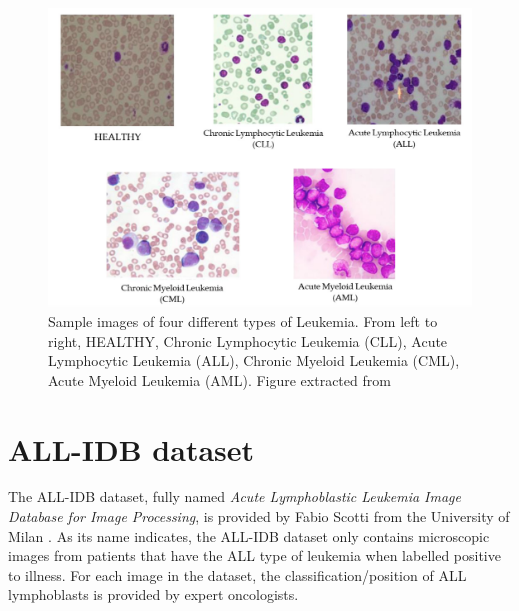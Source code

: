 \documentclass[11pt, openany]{report}
\theoremstyle{plain}
\theoremstyle{definition}
\theoremstyle{remark}
\begin{document}
\begin{figure}[H]
  \centering
  \includegraphics[scale=0.6]{figures/leukemia-subtypes.png}
  \caption{Sample images of four different types of Leukemia. From left to right, HEALTHY, Chronic Lymphocytic Leukemia (CLL), Acute Lymphocytic Leukemia (ALL), Chronic Myeloid Leukemia (CML), Acute Myeloid Leukemia (AML). Figure extracted from \cite{leukemia}}
  \label{fig:leukemia-subtypes}
\end{figure}

\newpage
\section{ALL-IDB dataset} \label{sec:all-idb}
The ALL-IDB dataset, fully named \textit{Acute Lymphoblastic Leukemia Image Database for Image Processing}, is provided by Fabio Scotti from the University of Milan \cite{ALL-IDB}. As its name indicates, the ALL-IDB dataset only contains microscopic images from patients that have the ALL type of leukemia when labelled positive to illness. For each image in the dataset, the classification/position of ALL lymphoblasts is provided by expert oncologists. 
\end{document}
